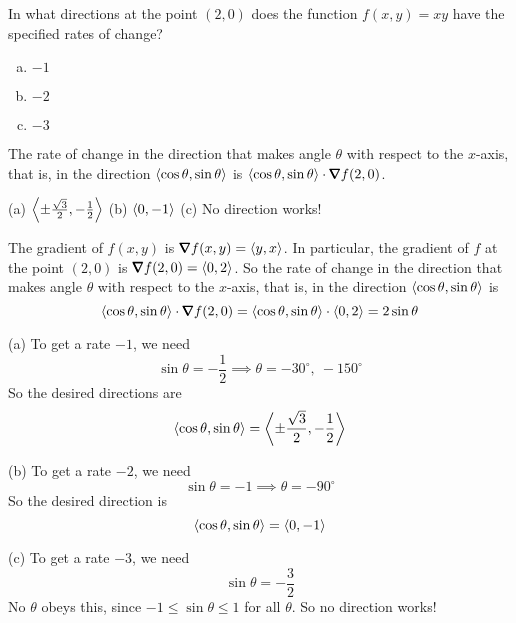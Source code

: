\begin{question}
 In what directions at the point $(2,0)$ does the function $f(x,y)=xy$
have the specified rates of change? 
\begin{enumerate}[(a)]
\item 
$-1$
\item
$-2$
\item
$-3$
\end{enumerate}
\end{question}

\begin{hint}
The rate of change in the direction that makes angle $\theta$ with
respect to the $x$-axis, that is, in the direction 
$\left< \cos\theta,\sin\theta\right>$ is 
$
\llt \cos\theta,\sin\theta\rgt \cdot\vnabla f(2,0)
$.
\end{hint}


\begin{answer}
(a) $\left<\pm\frac{\sqrt{3}}{2} ,-\frac{1}{2} \right>$\qquad
(b) $\left< 0 ,-1 \right>$ \qquad
(c) No direction works!

\end{answer}

\begin{solution}
The gradient of $f(x,y)$ is $\vnabla f(x,y)=\llt y,x\rgt$. In particular,
the gradient of $f$ at the point $(2,0)$ is
$\vnabla f(2,0)=\llt 0,2 \rgt$. So the rate of change in the direction 
that makes angle $\theta$ with respect to the $x$-axis, that is, 
in the direction 
$\left< \cos\theta,\sin\theta\right>$ is 
\begin{equation*}
\llt \cos\theta,\sin\theta\rgt \cdot\vnabla f(2,0)
=\llt \cos\theta,\sin\theta\rgt \cdot\llt 0, 2\rgt =2\sin\theta
\end{equation*}

(a) To get a rate $-1$, we need
\begin{equation*}
 \sin\theta=-\frac{1}{2} \implies \theta=-30^\circ,\ -150^\circ
\end{equation*}
So the desired directions are
\begin{equation*}
\left< \cos\theta,\sin\theta\right>
=\left<\pm\frac{\sqrt{3}}{2} ,-\frac{1}{2} \right>
\end{equation*}

(b) To get a rate $-2$, we need
\begin{equation*}
 \sin\theta=-1 \implies \theta=-90^\circ
\end{equation*}
So the desired direction is
\begin{equation*}
\left< \cos\theta,\sin\theta\right>
=\left< 0 ,-1 \right>
\end{equation*}

(c) To get a rate $-3$, we need
\begin{equation*}
 \sin\theta=-\frac{3}{2}
\end{equation*}
No $\theta$ obeys this, since $-1\le\sin\theta\le 1$ for all $\theta$. 
So no direction works!
\end{solution}

